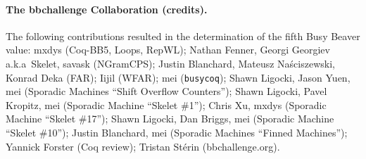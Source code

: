 \documentclass[a4paper,british]{article}
\theoremstyle{definition} %
\numberwithin{equation}{section}
\theoremstyle{definition} %
\newcommand{\CoqBB}{Coq-BB5\xspace}
\begin{document}
\date{}
\maketitle

\begin{abstract}
    We prove that $S(5) = 47,176,870$ using the Coq proof assistant. The Busy Beaver value $S(n)$ is the maximum~number of steps a halting n-state 2-symbol Turing machine can perform from the all-0 tape before halting and $S$ was historically introduced as one of the simplest examples of a noncomputable function.  The proof enumerates 181,385,789 Turing machines with 5 states, and for each, decide whether it halts or not.
    Our result marks the first determination of a new Busy Beaver value in over 40 years and the first Busy Beaver value to ever be formally verified, demonstrating the effectiveness of collaborative online research (\url{bbchallenge.org}).
\end{abstract}


\setcounter{tocdepth}{2}
\tableofcontents

\paragraph{The bbchallenge Collaboration (credits).} The following contributions resulted in the determination of the fifth Busy Beaver value: mxdys (\CoqBB, Loops, RepWL); Nathan Fenner, Georgi Georgiev a.k.a~Skelet, savask (NGramCPS); Justin Blanchard, Mateusz Naściszewski, Konrad Deka (FAR); Iijil (WFAR); mei (\texttt{busycoq}); Shawn Ligocki, Jason Yuen, mei (Sporadic Machines ``Shift Overflow Counters''); Shawn Ligocki, Pavel Kropitz, mei (Sporadic Machine ``Skelet \#1''); Chris Xu, mxdys (Sporadic Machine ``Skelet \#17''); Shawn Ligocki, Dan Briggs, mei (Sporadic Machine ``Skelet \#10''); Justin Blanchard, mei (Sporadic Machines ``Finned Machines''); Yannick Forster (Coq review); Tristan Stérin (bbchallenge.org).
\newpage

\begin{center}

\end{center}
\end{document}
